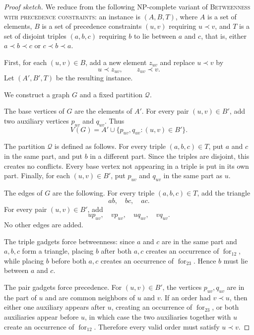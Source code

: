 \documentclass[12pt]{article}
\theoremstyle{plain}
\theoremstyle{definition}
\theoremstyle{remark}
\theoremstyle{definition}
\newcommand{\forlabel}{\mathrm{for}}
\DeclareRobustCommand{\forparam}[1]{%
  \ensuremath{\mathop{\forlabel}\nolimits_{#1}}%
}
\newcommand{\forrs}{\forparam{12}}
\newcommand{\forst}{\forparam{23}}
\begin{document}
\begin{proof}[Proof sketch]
We reduce from the following NP-complete variant of \textsc{Betweenness with precedence constraints}:
an instance is \((A,B,T)\), where \(A\) is a set of elements, \(B\) is a set of precedence constraints
\((u,v)\) requiring \(u\prec v\), and \(T\) is a set of disjoint triples \((a,b,c)\) requiring \(b\) to lie
between \(a\) and \(c\), that is, either \(a\prec b\prec c\) or \(c\prec b\prec a\).

First, for each \((u,v)\in B\), add a new element \(z_{uv}\) and replace \(u\prec v\) by
\[
u\prec z_{uv},
\qquad
z_{uv}\prec v.
\]
Let \((A',B',T)\) be the resulting instance.

We construct a graph \(G\) and a fixed partition \(\mathcal Q\).

The base vertices of \(G\) are the elements of \(A'\). For every pair \((u,v)\in B'\), add two auxiliary vertices
\(p_{uv}\) and \(q_{uv}\). Thus
\[
V(G)=A'\cup \{p_{uv},q_{uv}:(u,v)\in B'\}.
\]

The partition \(\mathcal Q\) is defined as follows. For every triple \((a,b,c)\in T\), put \(a\) and \(c\) in the
same part, and put \(b\) in a different part. Since the triples are disjoint, this creates no conflicts.
Every base vertex not appearing in a triple is put in its own part. Finally, for each \((u,v)\in B'\), put
\(p_{uv}\) and \(q_{uv}\) in the same part as \(u\).

The edges of \(G\) are the following. For every triple \((a,b,c)\in T\), add the triangle
\[
ab,\quad bc,\quad ac.
\]
For every pair \((u,v)\in B'\), add
\[
up_{uv},\quad vp_{uv},\quad uq_{uv},\quad vq_{uv}.
\]
No other edges are added.

The triple gadgets force betweenness: since \(a\) and \(c\) are in the same part and \(a,b,c\) form a triangle,
placing \(b\) after both \(a,c\) creates an occurrence of \(\forrs\), while placing \(b\) before both \(a,c\)
creates an occurrence of \(\forst\). Hence \(b\) must lie between \(a\) and \(c\).

The pair gadgets force precedence. For \((u,v)\in B'\), the vertices \(p_{uv},q_{uv}\) are in the part of \(u\) and
are common neighbors of \(u\) and \(v\). If an order had \(v\prec u\), then either one auxiliary appears after \(u\),
creating an occurrence of \(\forst\), or both auxiliaries appear before \(u\), in which case the two auxiliaries together
with \(u\) create an occurrence of \(\forrs\). Therefore every valid order must satisfy \(u\prec v\).


\end{proof}
\end{document}
